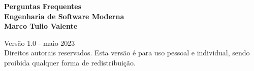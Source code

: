 \thispagestyle{empty}

\newpage
\thispagestyle{empty}
\vspace*{4.5cm}
\begin{center}
{\Huge \bf Perguntas Frequentes}\\ 
\vspace*{0.6cm}
{\Huge \bf Engenharia de Software Moderna}\\ 
\vspace*{3cm}
{\Large \bf Marco Tulio Valente}
\end{center}
\newpage

\thispagestyle{empty}
\vspace*{3cm}
\begin{center}
{\Large  Versão 1.0 - maio 2023}\\ 
\vspace*{1cm}
{Direitos autorais reservados. Esta versão é para uso pessoal e individual, sendo proibida qualquer forma de redistribuição.}
\end{center}
\newpage

\tableofcontents
